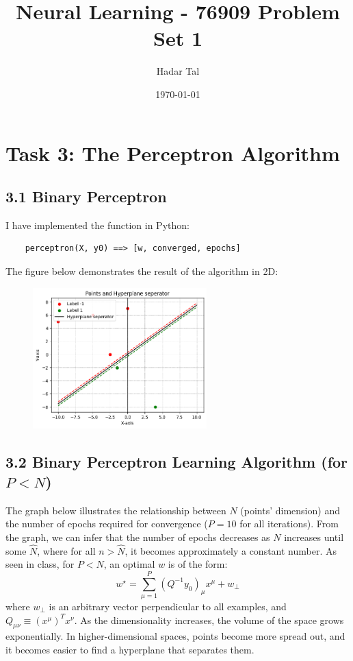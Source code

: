 \documentclass[a4paper, 12pt]{article}
\title{Neural Learning - 76909 Problem Set 1}
\author{Hadar Tal}
\date{\today}
\begin{document}
\maketitle

\section*{Task 3: The Perceptron Algorithm}

\subsection*{3.1 Binary Perceptron}
I have implemented the function in Python:
\begin{lstlisting}
    perceptron(X, y0) ==> [w, converged, epochs]
\end{lstlisting}
The figure below demonstrates the result of the algorithm in 2D:

\begin{figure}[h]
    \centering
    \includegraphics[width=0.6\textwidth]{./assets/nn_ex1_3_1.png}
\end{figure}

\subsection*{3.2 Binary Perceptron Learning Algorithm (for $P < N$)}
The graph below illustrates the relationship between $N$ (points' dimension) and the 
number of epochs required for convergence ($P=10$ for all iterations). 
From the graph, we can infer that the number of epochs decreases as $N$ increases until some $\hat{N}$, 
where for all $n > \hat{N}$, it becomes approximately a constant number. 
As seen in class, for $P < N$, an optimal $w$ is of the form:
\[ w^\star = \sum_{\mu = 1}^{P} (Q^{-1}y_0)_{\mu} x^{\mu} + w_{\bot }\]
where $w_{\bot }$ is an arbitrary vector perpendicular to all examples, 
and ${Q}_{\mu \nu } \equiv  {(x^\mu)}^T x^\nu$. 
As the dimensionality increases, the volume of the space grows exponentially. 
In higher-dimensional spaces, points become more spread out, and it becomes easier to find a hyperplane that separates them.
\end{document}
